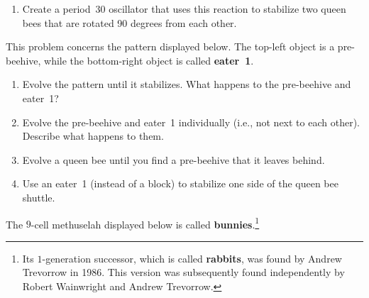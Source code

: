 \begin{multicols}{2}
\begin{problemstar}
\begin{enumerate}[label=\bf\color{ocre}(\alph*)]
			\item Create a period~30 oscillator that uses this reaction to stabilize two queen bees that are rotated 90 degrees from each other.
		\end{enumerate}
	\end{problemstar}
	
	
	\mfilbreak
	
	
	\begin{problemstar}\label{exer:queen_bee_eater_1} 
		This problem concerns the pattern displayed below. The top-left object is a pre-beehive, while the bottom-right object is called \textbf{eater~1}.
		\begin{center}
		\end{center}
		
		\begin{enumerate}[label=\bf\color{ocre}(\alph*)]
			\item Evolve the pattern until it stabilizes. What happens to the pre-beehive and eater~1?
			
			\item Evolve the pre-beehive and eater~1 individually (i.e., not next to each other). Describe what happens to them.
			
			\item Evolve a queen bee until you find a pre-beehive that it leaves behind.
			
			\item Use an eater~1 (instead of a block) to stabilize one side of the queen bee shuttle.
		\end{enumerate}
	\end{problemstar}
	
	
	\mfilbreak
	
	
	\begin{problem}\label{exer:bunnies} 
		The $9$-cell methuselah displayed below is called \textbf{bunnies}.\footnote{Its $1$-generation successor, which is called \textbf{rabbits}, was found by Andrew Trevorrow in 1986. This version was subsequently found independently by Robert Wainwright and Andrew Trevorrow.}
		
		\begin{center}
		\end{center}
		

\end{problem}
\end{multicols}
